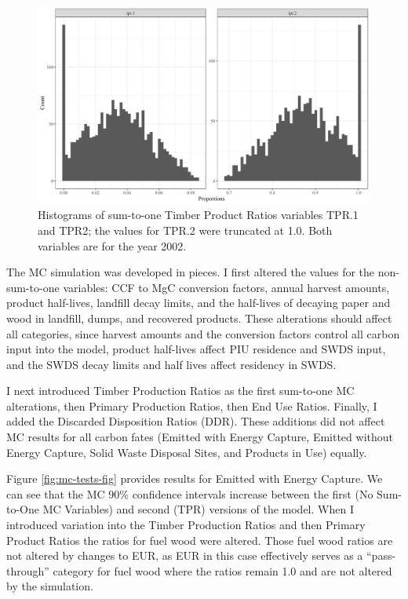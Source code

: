 \documentclass[
  openany]{book}
\begin{document}
\begin{figure}
\includegraphics[width=1\linewidth]{images/triang3} \caption{Histograms of sum-to-one Timber Product Ratios variables TPR.1 and TPR2; the values for TPR.2 were truncated at 1.0.  Both variables are for the year 2002.}\label{fig:mc-tri3-fig}
\end{figure}

The MC simulation was developed in pieces. I first altered the values for the non-sum-to-one variables: CCF to MgC conversion factors, annual harvest amounts, product half-lives, landfill decay limits, and the half-lives of decaying paper and wood in landfill, dumps, and recovered products. These alterations should affect all categories, since harvest amounts and the conversion factors control all carbon input into the model, product half-lives affect PIU residence and SWDS input, and the SWDS decay limits and half lives affect residency in SWDS.

I next introduced Timber Production Ratios as the first sum-to-one MC alterations, then Primary Production Ratios, then End Use Ratios. Finally, I added the Discarded Disposition Ratios (DDR). These additions did not affect MC results for all carbon fates (Emitted with Energy Capture, Emitted without Energy Capture, Solid Waste Disposal Sites, and Products in Use) equally.

Figure \ref{fig:mc-tests-fig} provides results for Emitted with Energy Capture. We can see that the MC 90\% confidence intervals increase between the first (No Sum-to-One MC Variables) and second (TPR) versions of the model. When I introduced variation into the Timber Production Ratios and then Primary Product Ratios the ratios for fuel wood were altered. Those fuel wood ratios are not altered by changes to EUR, as EUR in this case effectively serves as a ``pass-through'' category for fuel wood where the ratios remain 1.0 and are not altered by the simulation.
\end{document}
